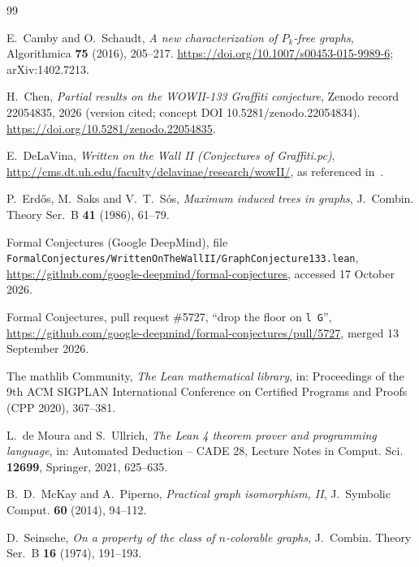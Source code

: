 \documentclass[11pt]{amsart}
\theoremstyle{definition}
\theoremstyle{remark}
\begin{document}
\begin{thebibliography}{99}

E.~Camby and O.~Schaudt, \emph{A new characterization of $P_k$-free graphs}, Algorithmica \textbf{75} (2016), 205--217. \url{https://doi.org/10.1007/s00453-015-9989-6}; arXiv:1402.7213.

H.~Chen, \emph{Partial results on the WOWII-133 Graffiti conjecture}, Zenodo record 22054835, 2026 (version cited; concept DOI 10.5281/zenodo.22054834). \url{https://doi.org/10.5281/zenodo.22054835}.

E.~DeLaVina, \emph{Written on the Wall II (Conjectures of Graffiti.pc)}, \url{http://cms.dt.uh.edu/faculty/delavinae/research/wowII/}, as referenced in~\cite{fc133}.

P.~Erd\H{o}s, M.~Saks and V.~T.~S\'os, \emph{Maximum induced trees in graphs}, J.~Combin. Theory Ser.~B \textbf{41} (1986), 61--79.

Formal Conjectures (Google DeepMind), file \nolinkurl{FormalConjectures/WrittenOnTheWallII/GraphConjecture133.lean}, \url{https://github.com/google-deepmind/formal-conjectures}, accessed 17 October 2026.

Formal Conjectures, pull request \#5727, ``drop the floor on \texttt{l G}'', \url{https://github.com/google-deepmind/formal-conjectures/pull/5727}, merged 13 September 2026.

The mathlib Community, \emph{The Lean mathematical library}, in: Proceedings of the 9th ACM SIGPLAN International Conference on Certified Programs and Proofs (CPP 2020), 367--381.

L.~de Moura and S.~Ullrich, \emph{The Lean 4 theorem prover and programming language}, in: Automated Deduction -- CADE 28, Lecture Notes in Comput. Sci. \textbf{12699}, Springer, 2021, 625--635.

B.~D.~McKay and A.~Piperno, \emph{Practical graph isomorphism, II}, J.~Symbolic Comput. \textbf{60} (2014), 94--112.

D.~Seinsche, \emph{On a property of the class of $n$-colorable graphs}, J.~Combin. Theory Ser.~B \textbf{16} (1974), 191--193.

\end{thebibliography}
\end{document}
